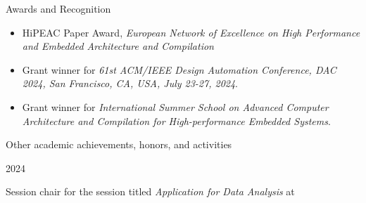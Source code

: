 \documentclass[
	a4paper, %
	10pt, %
]{tresume} %
\begin{document}
\begin{tSection}{Awards and Recognition}
  \begin{itemize}
  \item[2024] HiPEAC Paper Award, \emph{European Network of Excellence on High
      Performance and Embedded Architecture and Compilation}
  \item[2024] Grant winner for \emph{61st ACM/IEEE Design Automation
      Conference, DAC 2024, San Francisco, CA, USA, July 23-27,
      2024}.
  \item[2021] Grant winner for \emph{International Summer School on Advanced
      Computer Architecture and Compilation for High-performance Embedded
      Systems}.
  \end{itemize}
\end{tSection}

\begin{tSection}{Other academic achievements, honors, and activities}
  \begin{tSubsection}{2024}{}{}{}
    \item Session chair for the session titled \emph{Application for Data
        Analysis} at~
  \end{tSubsection}

\end{tSection}
\vfill
\ifpublic{%
    \ifgdpr{%
    
    
  }
  \fi
}
\fi
\end{document}
